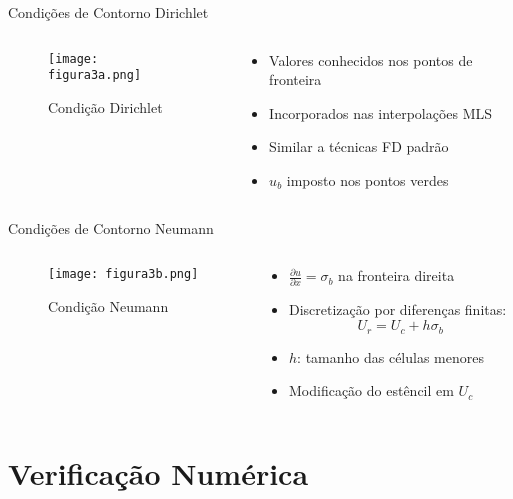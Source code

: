 \documentclass[../main/main.tex]{subfiles}
\begin{document}
\begin{frame}{Condições de Contorno Dirichlet}
\begin{columns}[T]
\begin{column}{0.5\textwidth}
\begin{figure}
\centering
\texttt{[image: figura3a.png]}
\caption{Condição Dirichlet}
\end{figure}
\end{column}
\begin{column}{0.5\textwidth}
\begin{itemize}
\item Valores conhecidos nos pontos de fronteira
\item Incorporados nas interpolações MLS
\item Similar a técnicas FD padrão
\item $u_b$ imposto nos pontos verdes
\end{itemize}
\end{column}
\end{columns}
\end{frame}

\begin{frame}{Condições de Contorno Neumann}
\begin{columns}[T]
\begin{column}{0.5\textwidth}
\begin{figure}
\centering
\texttt{[image: figura3b.png]}
\caption{Condição Neumann}
\end{figure}
\end{column}
\begin{column}{0.5\textwidth}
\begin{itemize}
\item $\frac{\partial u}{\partial x} = \sigma_b$ na fronteira direita
\item Discretização por diferenças finitas:
\[
U_r = U_c + h\sigma_b
\]
\item $h$: tamanho das células menores
\item Modificação do estêncil em $U_c$
\end{itemize}
\end{column}
\end{columns}
\end{frame}

\section{Verificação Numérica}
\end{document}
